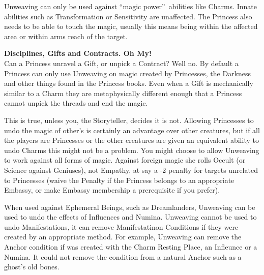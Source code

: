 Unweaving can only be used against \textquotedblleft magic power\textquotedblright\, abilities like Charms. Innate abilities such as Transformation or Sensitivity are unaffected. The Princess also needs to be able to touch the magic, usually this means being within the affected area or within arms reach of the target. 

\begin{mybox}

\noindent \textbf{Disciplines, Gifts and Contracts. Oh My!}\\

\noindent Can a Princess unravel a Gift, or unpick a Contract? Well no. By default a Princess can only use Unweaving on magic created by Princesses, the Darkness and other things found in the Princess books. Even when a Gift is mechanically similar to a Charm they are metaphysically different enough that a Princess cannot unpick the threads and end the magic.

This is true, unless you, the Storyteller, decides it is not. Allowing Princesses to undo the magic of other's is certainly an advantage over other creatures, but if all the players are Princesses or the other creatures are given an equivalent ability to undo Charms this might not be a problem. You might choose to allow Unweaving to work against all forms of magic. Against foreign magic she rolls Occult (or Science against Geniuses), not Empathy, at say a -2 penalty for targets unrelated to Princesses (waive the Penalty if the Princess belongs to an appropriate Embassy, or make Embassy membership a prerequisite if you prefer).\end{mybox}

When used against Ephemeral Beings, such as Dreamlanders, Unweaving can be used to undo the effects of Influences and Numina. Unweaving cannot be used to undo Manifestations, it can remove Manifestatinon Conditions if they were created by an appropriate method. For example, Unweaving can remove the Anchor condition if was created with the Charm Resting Place, an Infleunce or a Numina. It could not remove the condition from a natural Anchor such as a ghost's old bones. 

